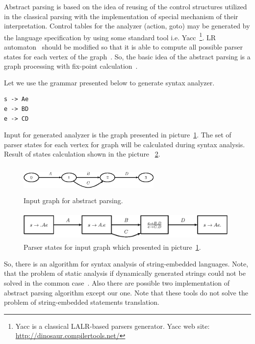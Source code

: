 Abstract parsing is based on the idea of reusing of the control structures utilized in the classical parsing with the 
implementation of special mechanism of their interpretation. Control tables for the analyzer (action, goto) may be generated by
 the language specification by using some standard tool i.e. Yacc~\footnote{Yacc is a classical LALR-based parsers generator. 
Yacc web site: \href{http://dinosaur.compilertools.net/}{http://dinosaur.compilertools.net/}}. LR automaton~\cite{Grune} should
 be modified so that it is able to compute all possible parser states for each vertex of the graph~\cite{AbstrParsing}. 
So, the basic idea of the abstract parsing is a graph processing with fix-point calculation~\cite{ALVOR2}.

Let we use the grammar presented below to generate syntax analyzer.

\begin{verbatim}
s -> Ae
e -> BD
e -> CD
\end{verbatim}

Input for generated analyzer is the graph presented in picture~\ref{pic2}. The set of parser states for each vertex for 
graph will be calculated during syntax analysis. Result of states calculation shown in the picture ~\ref{pic3}.

\begin{figure}
    \begin{center}
        \includegraphics[width=7cm,height=1.5cm]{graphs/simple_grammar_inpt.eps}
        \caption{Input graph for abstract parsing.}
        \label{pic2}
    \end{center}
\end{figure}

\begin{figure}
    \begin{center}
        \includegraphics[width=11cm,height=1.5cm]{graphs/simple_grammar_items.eps}
        \caption{Parser states for input graph which presented in picture~\ref{pic2}.}
        \label{pic3}
    \end{center}
\end{figure}

So, there is an algorithm for syntax analysis of string-embedded languages. Note, that the problem of static 
analysis if dynamically generated strings could not be solved in the common case~\cite{ALVOR2}. Also there are 
possible two implementation of abstract parsing algorithm except our one. Note that these tools do not solve 
the problem of string-embedded statements translation.


